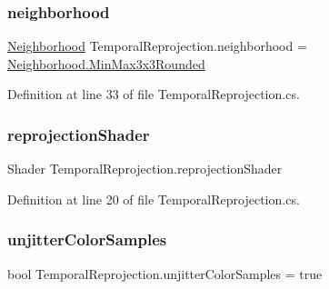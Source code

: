 \mbox{\label{class_temporal_reprojection_ac9def060454294eb980e711f3b86024d}} 
\subsubsection{\texorpdfstring{neighborhood}{neighborhood}}
{\footnotesize\ttfamily \mbox{\hyperlink{class_temporal_reprojection_a6b3343c06d004430c301f11de9bc732c}{Neighborhood}} Temporal\+Reprojection.\+neighborhood = \mbox{\hyperlink{class_temporal_reprojection_a6b3343c06d004430c301f11de9bc732ca18aa98e3dd602e39b1c5ba8e71132360}{Neighborhood.\+Min\+Max3x3\+Rounded}}}



Definition at line 33 of file Temporal\+Reprojection.\+cs.

\mbox{\label{class_temporal_reprojection_ac0bc023519956124bb77b3a66c95e2b6}} 
\subsubsection{\texorpdfstring{reprojection\+Shader}{reprojectionShader}}
{\footnotesize\ttfamily Shader Temporal\+Reprojection.\+reprojection\+Shader}



Definition at line 20 of file Temporal\+Reprojection.\+cs.

\mbox{\label{class_temporal_reprojection_aeaba2237b1425f7c5b70e6b80a9d33ba}} 
\subsubsection{\texorpdfstring{unjitter\+Color\+Samples}{unjitterColorSamples}}
{\footnotesize\ttfamily bool Temporal\+Reprojection.\+unjitter\+Color\+Samples = true}



